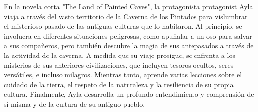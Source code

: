 

En la novela corta "The Land of Painted Caves", la protagonista protagonist Ayla viaja a través del vasto territorio de la Caverna de los Pintados para vislumbrar el misterioso pasado de las antiguas culturas que lo habitaron. Al principio, se involucra en diferentes situaciones peligrosas, como apuñalar a un oso para salvar a sus compañeros, pero también descubre la magia de sus antepasados a través de la actividad de la caverna. A medida que su viaje prosigue, se enfrenta a los misterios de sus anteriores civilizaciones, que incluyen tesoros ocultos, seres versátiles, e incluso milagros. Mientras tanto, aprende varias lecciones sobre el cuidado de la tierra, el respeto de la naturaleza y la resiliencia de su propia cultura. Finalmente, Ayla desarrolla un profundo entendimiento y comprensión de sí misma y de la cultura de su antiguo pueblo.